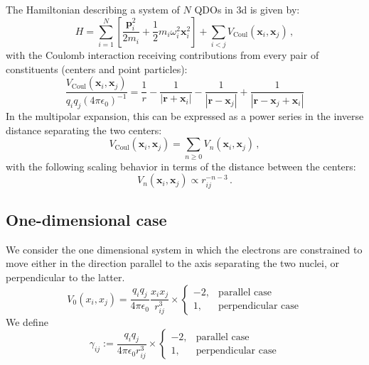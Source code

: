 \documentclass[reprint, amsmath, amssymb, aps]{revtex4-2}
\begin{document}
    The Hamiltonian describing a system of $N$ QDOs in 3d is given by:
    \begin{equation}
    \label{eq:full_QDO_Hamiltonian}
        H=\sum_{i=1}^N\left[\frac{\bm{p} _i^2}{2m_i} + \frac{1}{2}m_i\omega_i^2\bm{x} _i^2\right] +\sum_{i<j}V_\text{Coul}\left(\bm{x} _i, \bm{x} _j\right)\,,
    \end{equation}
    with the Coulomb interaction receiving contributions from every pair of constituents (centers and point particles):
    \begin{equation}
    \label{eq:full_coulomb_potential}
        \frac{V_\text{Coul}\left(\bm{x} _i, \bm{x} _j\right)}{q_iq_j(4\pi\epsilon_0)^{-1}}=\frac{1}{r} - \frac{1}{|\bm{r}  + \bm{x} _i|} - \frac{1}{|\bm{r}  - \bm{x} _j|} + \frac{1}{|\bm{r}  - \bm{x} _j + \bm{x} _i|}
    \end{equation}
    In the multipolar expansion, this can be expressed as a power series in the inverse distance separating the two centers:
    \begin{equation}
        V_\text{Coul}\left(\bm{x} _i, \bm{x} _j\right)= \sum_{n\geq 0} V_n\left(\bm{x} _i, \bm{x} _j\right)\,,
    \end{equation}
    with the following scaling behavior in terms of the distance between the centers:
    \begin{equation}
        V_n\left(\bm{x} _i, \bm{x} _j\right)\propto r_{ij}^{-n-3}\,.
    \end{equation}

        \subsection{One-dimensional case}

        We consider the one dimensional system in which the electrons are constrained to move either in the direction parallel to the axis separating the two nuclei, or perpendicular to the latter.
        \begin{equation}
            V_0(x_i, x_j) = \frac{q_iq_j}{4\pi\epsilon_0}\frac{x_ix_j}{r_{ij}^3}\times
            \begin{cases}
                -2, & \text{parallel case} \\
                1, & \text{perpendicular case}
            \end{cases}
        \end{equation}
        We define
        \begin{equation}
            \gamma_{ij} := \frac{q_iq_j}{4\pi\epsilon_0r_{ij}^3}\times
            \begin{cases}
                -2, & \text{parallel case} \\
                1, & \text{perpendicular case}
            \end{cases}
        \end{equation}
\end{document}
